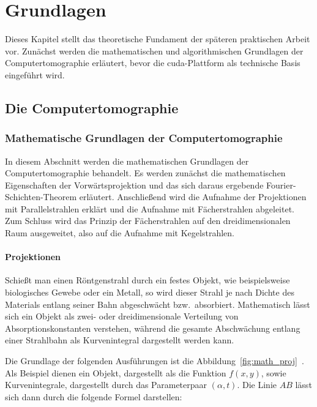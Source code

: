 \chapter{Grundlagen}

Dieses Kapitel stellt das theoretische Fundament der späteren praktischen Arbeit vor. Zunächst werden die
mathematischen und algorithmischen Grundlagen der Computertomographie erläutert, bevor die \gls{cuda}-Plattform als
technische Basis eingeführt wird.

\section{Die Computertomographie}

\subsection{Mathematische Grundlagen der Computertomographie}

In diesem Abschnitt werden die mathematischen Grundlagen der Computertomographie behandelt. Es werden zunächst die
mathematischen Eigenschaften der Vorwärtsprojektion und das sich daraus ergebende Fourier-Schichten-Theorem erläutert.
Anschließend wird die Aufnahme der Projektionen mit Parallelstrahlen erklärt und die Aufnahme mit Fächerstrahlen
abgeleitet. Zum Schluss wird das Prinzip der Fächerstrahlen auf den dreidimensionalen Raum ausgeweitet, also auf die
Aufnahme mit Kegelstrahlen.

\subsubsection{Projektionen}

Schießt man einen Röntgenstrahl durch ein festes Objekt, wie beispielsweise biologisches Gewebe oder ein Metall, so wird
dieser Strahl je nach Dichte des Materials entlang seiner Bahn abgeschwächt bzw.\ absorbiert. Mathematisch lässt sich
ein Objekt als zwei- oder dreidimensionale Verteilung von Absorptionskonstanten verstehen, während die gesamte
Abschwächung entlang einer Strahlbahn als Kurvenintegral dargestellt werden kann.

Die Grundlage der folgenden Ausführungen ist die Abbildung~\ref{fig:math_proj}~\cite{kak}. Als Beispiel dienen ein
Objekt, dargestellt als die Funktion $f(x, y)$, sowie Kurvenintegrale, dargestellt durch das Parameterpaar
$(\alpha, t)$. Die Linie $AB$ lässt sich dann durch die folgende Formel darstellen:

